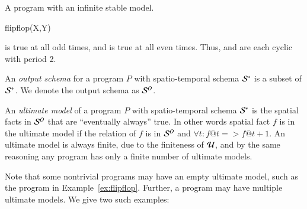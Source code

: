 
\begin{example}
\label{ex:flipflop}
A \lang program with an infinite stable model.

\begin{Drules}
        {flipflop(X,Y)} \\
\end{Drules}

 is true at all odd times, and  is true at all even times.  Thus,  and  are each cyclic with period 2.
\end{example}

An {\em output schema} for a \lang program $P$ with spatio-temporal schema $\stschema$ is a subset of $\sschema$.  We denote the output schema as $\oschema$.

An {\em ultimate model} of a \lang program $P$ with spatio-temporal schema $\stschema$ is the spatial facts in $\oschema$ that are ``eventually always'' true.  In other words spatial fact $f$ is in the ultimate model if the relation of $f$ is in $\oschema$ and $\forall t : f@t => f@t+1$. 
An ultimate model is always finite, due to the finiteness of $\univ$, and by the same reasoning any \lang program has only a finite number of ultimate models.

Note that some nontrivial programs may have an empty ultimate model, such as the program in Example~\ref{ex:flipflop}.  Further, a \lang program may have multiple ultimate models.  We give two such examples:

